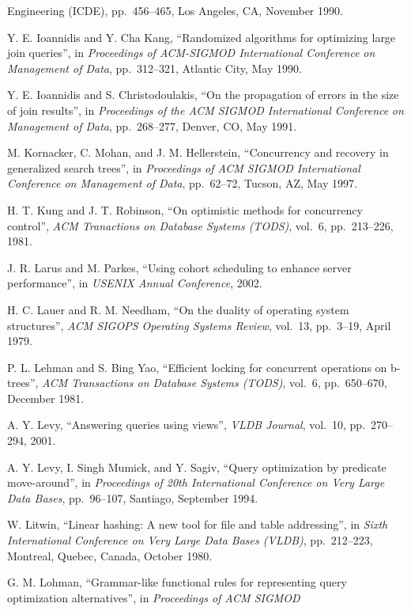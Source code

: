 \documentclass[a4paper,11pt,twoside,openright]{book}
\begin{document}
\begin{enumerate}[label={[\arabic*]}]
{  Engineering (ICDE)}, pp.~456--465, Los Angeles, CA, November 1990.
\item
  Y. E. Ioannidis and Y. Cha Kang, ``Randomized algorithms for
  optimizing large join queries'', in \emph{Proceedings of ACM-SIGMOD
  International Conference} \emph{on Management of Data}, pp.~312--321,
  Atlantic City, May 1990.
\item
  Y. E. Ioannidis and S. Christodoulakis, ``On the propagation of errors
  in the size of join results'', in \emph{Proceedings of the ACM SIGMOD
  International Conference} \emph{on Management of Data}, pp.~268--277,
  Denver, CO, May 1991.
\item
  M. Kornacker, C. Mohan, and J. M. Hellerstein, ``Concurrency and
  recovery in generalized search trees'', in \emph{Proceedings of ACM
  SIGMOD International} \emph{Conference on Management of Data},
  pp.~62--72, Tucson, AZ, May 1997.
\item
  H. T. Kung and J. T. Robinson, ``On optimistic methods for concurrency
  control'', \emph{ACM Tranactions on Database Systems (TODS)}, vol.~6,
  pp.~213--226, 1981.
\item
  J. R. Larus and M. Parkes, ``Using cohort scheduling to enhance server
  performance'', in \emph{USENIX Annual Conference}, 2002.
\item
  H. C. Lauer and R. M. Needham, ``On the duality of operating system
  structures'', \emph{ACM SIGOPS Operating Systems Review}, vol.~13,
  pp.~3--19, April 1979.
\item
  P. L. Lehman and S. Bing Yao, ``Efficient locking for concurrent
  operations on b-trees'', \emph{ACM Transactions on Database Systems
  (TODS)}, vol.~6, pp.~650--670, December 1981.
\item
  A. Y. Levy, ``Answering queries using views'', \emph{VLDB Journal},
  vol.~10, pp.~270-- 294, 2001.
\item
  A. Y. Levy, I. Singh Mumick, and Y. Sagiv, ``Query optimization by
  predicate move-around'', in \emph{Proceedings of 20th International
  Conference on Very Large} \emph{Data Bases}, pp.~96--107, Santiago,
  September 1994.
\item
  W. Litwin, ``Linear hashing: A new tool for file and table
  addressing'', in \emph{Sixth} \emph{International Conference on Very
  Large Data Bases (VLDB)}, pp.~212--223, Montreal, Quebec, Canada,
  October 1980.
\item
  G. M. Lohman, ``Grammar-like functional rules for representing query
  optimization alternatives'', in \emph{Proceedings of ACM SIGMOD
}
\end{enumerate}
\end{document}
